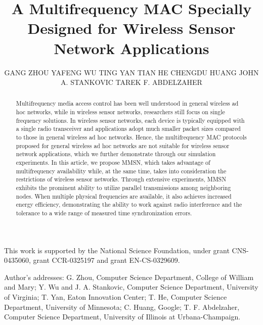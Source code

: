 \documentclass[prodmode,acmtecs]{acmsmall}
\begin{document}

\title{A Multifrequency MAC Specially Designed for Wireless Sensor Network Applications}
\author{GANG ZHOU
YAFENG WU
TING YAN
TIAN HE
CHENGDU HUANG
JOHN A. STANKOVIC
TAREK F. ABDELZAHER
}

\begin{abstract}
Multifrequency media access control has been well understood in
general wireless ad hoc networks, while in wireless sensor networks,
researchers still focus on single frequency solutions. In wireless
sensor networks, each device is typically equipped with a single
radio transceiver and applications adopt much smaller packet sizes
compared to those in general wireless ad hoc networks. Hence, the
multifrequency MAC protocols proposed for general wireless ad hoc
networks are not suitable for wireless sensor network applications,
which we further demonstrate through our simulation experiments. In
this article, we propose MMSN, which takes advantage of
multifrequency availability while, at the same time, takes into
consideration the restrictions of wireless sensor networks. Through
extensive experiments, MMSN exhibits the prominent ability to utilize
parallel transmissions among neighboring nodes. When multiple physical
frequencies are available, it also achieves increased energy
efficiency, demonstrating the ability to work against radio
interference and the tolerance to a wide range of measured time
synchronization errors.
\end{abstract}





\begin{bottomstuff}
This work is supported by the National Science Foundation, under
grant CNS-0435060, grant CCR-0325197 and grant EN-CS-0329609.

Author's addresses: G. Zhou, Computer Science Department,
College of William and Mary; Y. Wu  {and} J. A. Stankovic,
Computer Science Department, University of Virginia; T. Yan,
Eaton Innovation Center; T. He, Computer Science Department,
University of Minnesota; C. Huang, Google; T. F. Abdelzaher,
Computer Science Department, University of Illinois at Urbana-Champaign.
\end{bottomstuff}
\end{document}
